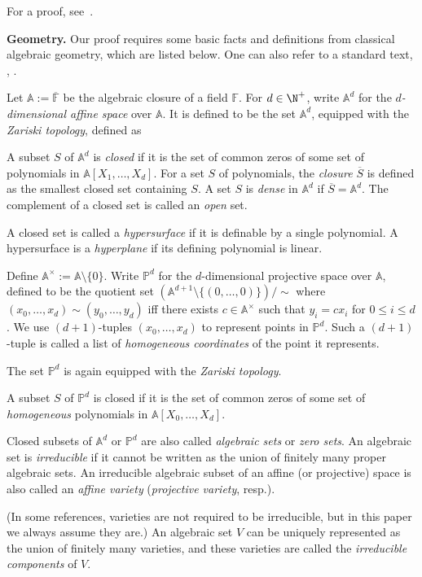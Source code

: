 \documentclass{toc}
\newcommand{\F}{\mathbb{F}}
\newcommand{\aff}{\mathbb{A}}
\newcommand{\proj}{\mathbb{P}}
\newcommand{\ol}[1]{\overline{#1}}
\begin{document}
For a proof, see~\cite[Lemma~A.36]{AB09}.

\smallskip\noindent
\textbf{Geometry.} Our proof requires some basic facts and definitions from classical algebraic geometry, which are listed below. One can also refer to a standard text, \eg, \cite{Har92, hartshorne2013algebraic}.  

\smallskip
Let $\aff:=\ol{\F}$ be the algebraic closure of a field $\F$. For $d\in\N^+$, write $\aff^d$ for the \emph{$d$-dimensional affine space} over $\aff$. It is defined to be the set $\aff^d$, equipped with the \emph{Zariski topology}, defined as %
\begin{definition}   %
A subset $S$ of $\aff^d$ is \emph{closed}
%
if   %
it is the set of common zeros of some
%
set   %
of polynomials in $\aff[X_1,\dots,X_d]$. For
%
a set $S$ of polynomials,
%
%
the \emph{closure} $\ol{S}$
%
is defined as  %
the smallest closed set containing $S$.
%
A set  %
$S$ is \emph{dense} in $\aff^d$  if $\ol{S}=\aff^d$.
%
%
The complement of a closed set is called an \emph{open} set.  %
\end{definition}

%
%
%

A closed set is called a \emph{hypersurface} 
if it is definable by a single polynomial.
A hypersurface is a \emph{hyperplane} if its
defining polynomial is linear.

Define $\aff^\times:= \aff\setminus\{0\}$.
Write $\proj^d$ for the $d$-dimensional projective space over $\aff$, defined to be the quotient set $(\aff^{d+1}\setminus\{(0,\dots,0)\})/\sim$
%
where   %
$(x_0,\dots,x_d)\sim (y_0,\dots,y_d)$ iff there exists $c\in\aff^\times$ such that $y_i=c x_i$ for $0\leq i\leq d$.
%
We use $(d+1)$-tuples $(x_0,\dots,x_d)$ to represent points in $\proj^d$.
%
%
Such a $(d+1)$-tuple is called a list of \emph{homogeneous coordinates}
of the point it represents.   %

The set $\proj^d$ is again equipped with the \emph{Zariski topology}.
%
\begin{definition} %
A subset $S$ of $\proj^d$ is closed
%
if  %
it is the set of common zeros of some
%
set   %
of \emph{homogeneous} polynomials in  $\aff[X_0,\dots,X_d]$. 
\end{definition}

%
%
\begin{definition}[Variety]  %
Closed subsets of $\aff^d$ or $\proj^d$ are also called
\emph{algebraic sets} or \emph{zero sets}. 
An algebraic set is \emph{irreducible} if it cannot be written
as the union of finitely many proper algebraic sets.
An irreducible algebraic subset of an affine
%
(or projective)    %
space is also called an \emph{affine variety}
%
(\emph{projective variety}, resp.).
\end{definition}
(In some references, varieties are not required to be irreducible, but
in this  %
paper   %
we always assume
%
they are.)  %
An algebraic set $V$ can be uniquely represented as the union of finitely many varieties, and these varieties are called the \emph{irreducible components} of $V$.
\end{document}

